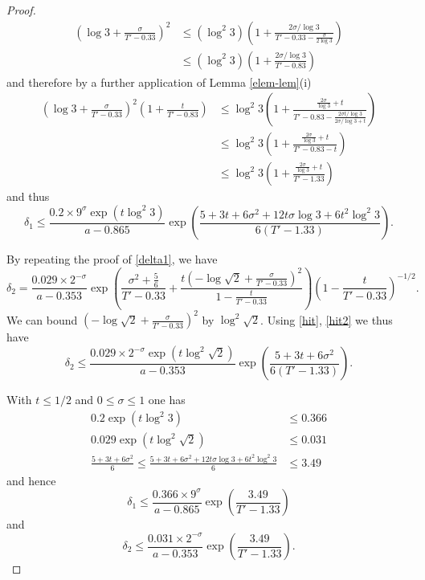 \begin{proof}
\begin{align*}
\left(\log 3 + \frac{\sigma}{T'-0.33}\right)^2 &\leq (\log^2 3) \left(1 + \frac{2 \sigma / \log 3}{T' - 0.33 - \frac{\sigma}{2\log 3}}\right) \\
&\leq  (\log^2 3) \left(1 + \frac{2 \sigma / \log 3}{T' - 0.83}\right)
\end{align*}
and therefore by a further application of Lemma \ref{elem-lem}(i)
\begin{align*}
\left(\log 3 + \frac{\sigma}{T'-0.33}\right)^2 \left(1 + \frac{t}{T'-0.83}\right) 
&\leq \log^2 3 \left(1 + \frac{\frac{2 \sigma}{\log 3} + t}{T' - 0.83 - \frac{2\sigma t/\log 3}{2\sigma/\log 3 + t}}\right) \\
&\leq \log^2 3 \left(1 + \frac{\frac{2 \sigma}{\log 3} + t}{T' - 0.83 - t}\right) \\
&\leq \log^2 3 \left(1 + \frac{\frac{2 \sigma}{\log 3} + t}{T' - 1.33}\right) 
\end{align*}
and thus
$$ \delta_1 \leq \frac{0.2 \times 9^\sigma \exp( t \log^2 3 )}{a-0.865} \exp\left( \frac{5+3t+6\sigma^2 + 12 t \sigma \log 3 + 6t^2 \log^2 3}{6(T'-1.33)} \right).$$

By repeating the proof of \eqref{delta1}, we have
$$
 \delta_2 = \frac{0.029 \times 2^{-\sigma}}{a - 0.353} \exp\left( \frac{\sigma^2 + \frac{5}{6}}{T'-0.33} + \frac{t\left(-\log \sqrt{2} + \frac{\sigma}{T'-0.33}\right)^2}{1 - \frac{t}{T'-0.33}} \right) \left(1 - \frac{t}{T'-0.33}\right)^{-1/2}.$$
We can bound $(-\log \sqrt{2} + \frac{\sigma}{T'-0.33})^2$ by $\log^2 \sqrt{2}$.  Using \eqref{hit}, \eqref{hit2} we thus have
$$
 \delta_2 \leq \frac{0.029 \times 2^{-\sigma} \exp( t \log^2 \sqrt{2})}{a - 0.353} \exp\left( \frac{5 + 3t + 6\sigma^2}{6(T'-1.33)} \right).
$$

With $t \leq 1/2$ and $0 \leq \sigma \leq 1$ one has
\begin{align*}
 0.2 \exp(t \log^2 3) &\leq 0.366 \\
0.029 \exp( t \log^2 \sqrt{2}) &\leq 0.031 \\
\frac{5 + 3t + 6\sigma^2}{6} \leq \frac{5 + 3t + 6\sigma^2 + 12 t \sigma \log 3 + 6t^2 \log^2 3}{6} &\leq 3.49
\end{align*}
and hence
$$ \delta_1 \leq \frac{0.366 \times 9^\sigma}{a-0.865} \exp\left( \frac{3.49}{T'-1.33} \right)$$
and
$$ \delta_2 \leq \frac{0.031 \times 2^{-\sigma}}{a-0.353} \exp\left( \frac{3.49}{T'-1.33} \right).$$


\end{proof}
